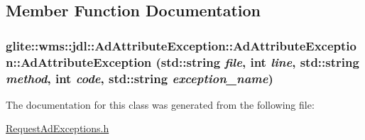 \subsection{Member Function Documentation}
\hypertarget{classglite_1_1wms_1_1jdl_1_1AdAttributeException_a0}{
\subsubsection[AdAttributeException::AdAttributeException]{\setlength{\rightskip}{0pt plus 5cm}glite::wms::jdl::Ad\-Attribute\-Exception::Ad\-Attribute\-Exception::Ad\-Attribute\-Exception (std::string {\em file}, int {\em line}, std::string {\em method}, int {\em code}, std::string {\em exception\_\-name})}}
\label{classglite_1_1wms_1_1jdl_1_1AdAttributeException_a0}




The documentation for this class was generated from the following file:\begin{CompactItemize}
\item 
\hyperlink{RequestAdExceptions_8h}{Request\-Ad\-Exceptions.h}\end{CompactItemize}
